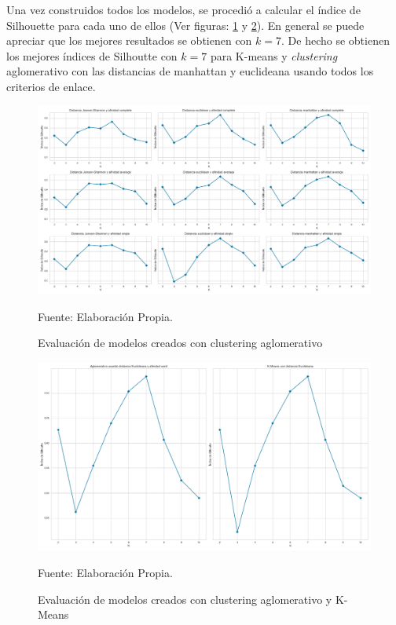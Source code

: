     Una vez construidos todos los modelos, se procedió a calcular el índice de Silhouette para cada uno de ellos (Ver figuras: \ref{fig:aglomerative_silhoutte} y \ref{fig:k-means_silhoutte}). En general se puede apreciar que los mejores resultados se obtienen con $k=7$. De hecho se obtienen los mejores índices de Silhoutte con $k=7$ para K-means y \textit{clustering} aglomerativo con las distancias de manhattan y euclideana usando todos los criterios de enlace.

     \begin{figure}[H]
        \centering
        \includegraphics[width=1\textwidth]{figures/Clustering/aglomerative_clustering.png}
        \caption{\label{fig:aglomerative_silhoutte} Evaluación de modelos creados con clustering aglomerativo} Fuente: Elaboración Propia.
    \end{figure}
    
    \begin{figure}[H]
        \centering
        \includegraphics[width=1\textwidth]{figures/Clustering/k-means.png}
        \caption{\label{fig:k-means_silhoutte} Evaluación de modelos creados con clustering aglomerativo y K-Means} Fuente: Elaboración Propia.
    \end{figure}
    
